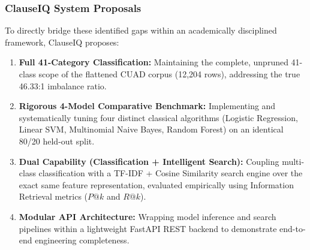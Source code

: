 \subsubsection*{ClauseIQ System Proposals}
To directly bridge these identified gaps within an academically disciplined framework, ClauseIQ proposes:
\begin{enumerate}
    \item \textbf{Full 41-Category Classification:} Maintaining the complete, unpruned 41-class scope of the flattened CUAD corpus (12,204 rows), addressing the true 46.33:1 imbalance ratio.
    \item \textbf{Rigorous 4-Model Comparative Benchmark:} Implementing and systematically tuning four distinct classical algorithms (Logistic Regression, Linear SVM, Multinomial Naive Bayes, Random Forest) on an identical 80/20 held-out split.
    \item \textbf{Dual Capability (Classification + Intelligent Search):} Coupling multi-class classification with a TF-IDF + Cosine Similarity search engine over the exact same feature representation, evaluated empirically using Information Retrieval metrics ($P@k$ and $R@k$).
    \item \textbf{Modular API Architecture:} Wrapping model inference and search pipelines within a lightweight FastAPI REST backend to demonstrate end-to-end engineering completeness.
\end{enumerate}
